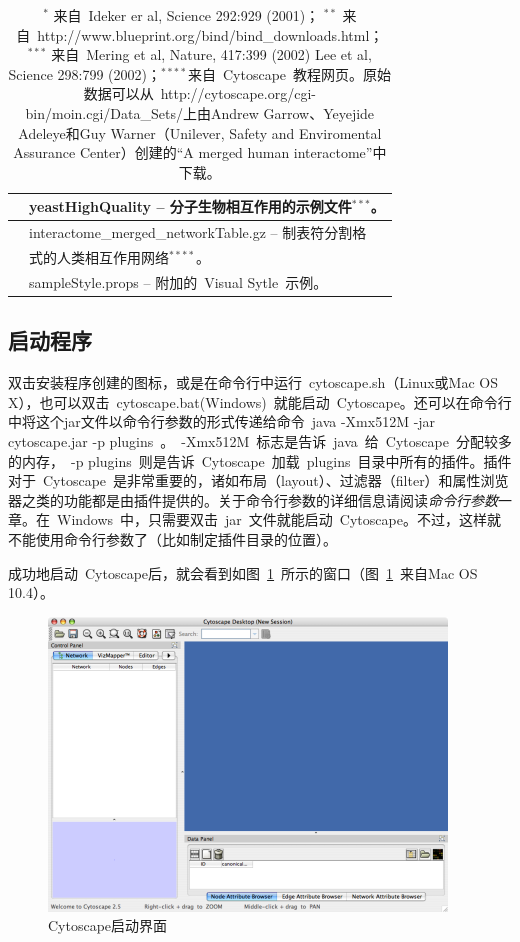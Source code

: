 \begin{table}[!h]
\begin{tabular}{|l|l|}
			\hline
				& yeastHighQuality -- 分子生物相互作用的示例文件$^{***}$。\\
			\hline
				\multirow{2}{*}{} & interactome\_{}merged\_{}networkTable.gz -- 制表符分割格\\ & 式的人类相互作用网络$^{****}$。\\
			\hline
				& sampleStyle.props -- 附加的~Visual Sytle~示例。\\
			\hline
		\end{tabular}
		\caption{$^*$ 来自~Ideker er al, Science 292:929 (2001)； $^{**}$ 来自~http://www.blueprint.org/bind/bind\_{}downloads.html； $^{***}$ 来自~Mering et al, Nature, 417:399 (2002) Lee et al, Science 298:799 (2002)；$^{****}$来自~Cytoscape~教程网页。原始数据可以从~http://cytoscape.org/cgi-bin/moin.cgi/Data\_{}Sets/上由Andrew Garrow、Yeyejide Adeleye和Guy Warner（Unilever, Safety and Enviromental Assurance Center）创建的“A merged human interactome”中下载。 }
		\label{table:3}
		\end{table}

	\subsection{启动程序}
		双击安装程序创建的图标，或是在命令行中运行~cytoscape.sh（Linux或Mac OS X），也可以双击~cytoscape.bat(Windows)~就能启动~Cytoscape。还可以在命令行中将这个jar文件以命令行参数的形式传递给命令~java -Xmx512M -jar cytoscape.jar -p plugins~。~-Xmx512M~标志是告诉~java~给~Cytoscape~分配较多的内存，~-p plugins~则是告诉~Cytoscape~加载~plugins~目录中所有的插件。插件对于~Cytoscape~是非常重要的，诸如布局（layout）、过滤器（filter）和属性浏览器之类的功能都是由插件提供的。关于命令行参数的详细信息请阅读\textit{命令行参数}一章。在~Windows~中，只需要双击~jar~文件就能启动~Cytoscape。不过，这样就不能使用命令行参数了（比如制定插件目录的位置）。

		成功地启动~Cytoscape后，就会看到如图~\ref{fig:1.1}~所示的窗口（图~\ref{fig:1.1}~来自Mac OS 10.4）。

		\begin{figure}[h]
			\includegraphics[width=\textwidth]{images/cytoscape_startup_mac.png}
			\caption{Cytoscape启动界面}
			\label{fig:1.1}
		\end{figure}

